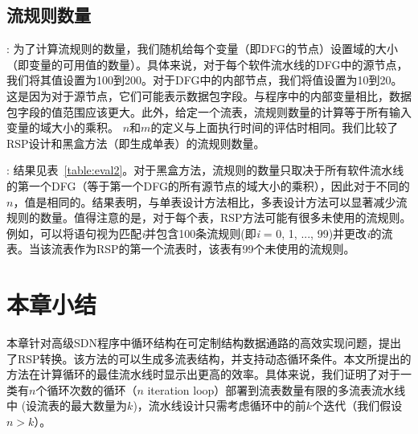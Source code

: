 \subsection{流规则数量}

: 为了计算流规则的数量，我们随机给每个变量（即DFG的节点）设置域的大小（即变量的可用值的数量）。具体来说，对于每个软件流水线的DFG中的源节点，我们将其值设置为100到200。对于DFG中的内部节点，我们将值设置为10到20。这是因为对于源节点，它们可能表示数据包字段。与程序中的内部变量相比，数据包字段的值范围应该更大。此外，给定一个流表，流规则数量的计算等于所有输入变量的域大小的乘积。
$n$和$m$的定义与上面执行时间的评估时相同。我们比较了RSP设计和黑盒方法（即生成单表）的流规则数量。

: 结果见表~\ref{table:eval2}。对于黑盒方法，流规则的数量只取决于所有软件流水线的第一个DFG（等于第一个DFG的所有源节点的域大小的乘积），因此对于不同的$n$，值是相同的。结果表明，与单表设计方法相比，多表设计方法可以显著减少流规则的数量。值得注意的是，对于每个表，RSP方法可能有很多未使用的流规则。例如，可以将语句视为匹配\emph{i}并包含100条流规则(即\emph{i} = 0, 1, ..., 99)并更改\emph{i}的流表。当该流表作为RSP的第一个流表时，该表有99个未使用的流规则。

\vspace{0.5cm}
\begin{table}[!htbp]
\centering
{}
\caption{\small 单表方法和RSP方法下的流规则数。}
\label{table:eval2}
\end{table}

\section{本章小结}

本章针对高级SDN程序中循环结构在可定制结构数据通路的高效实现问题，提出了RSP转换。该方法的可以生成多流表结构，并支持动态循环条件。本文所提出的方法在计算循环的最佳流水线时显示出更高的效率。具体来说，我们证明了对于一类有$n$个循环次数的循环（$n$ iteration loop）部署到流表数量有限的多流表流水线中 (设流表的最大数量为$k$)，流水线设计只需考虑循环中的前$k$个迭代（我们假设$n > k$）。

